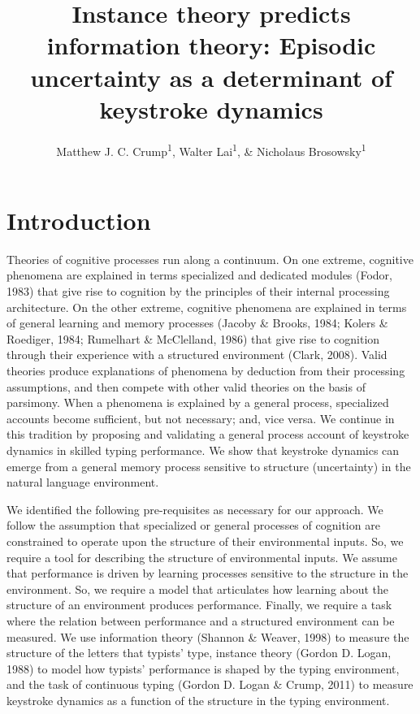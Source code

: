 \documentclass[floatsintext,man]{apa6}
\title{Instance theory predicts information theory: Episodic uncertainty as a
determinant of keystroke dynamics}
\author{Matthew J. C. Crump\textsuperscript{1}, Walter Lai\textsuperscript{1}, \& Nicholaus Brosowsky\textsuperscript{1}}
\affiliation{
    \vspace{0.5cm}
          \textsuperscript{1} Brooklyn College of the City University of New York  }
\theoremstyle{definition}
\theoremstyle{definition}
\theoremstyle{definition}
\theoremstyle{remark}
\begin{document}
\maketitle

\setcounter{secnumdepth}{0}



\section{Introduction}\label{introduction}

Theories of cognitive processes run along a continuum. On one extreme,
cognitive phenomena are explained in terms specialized and dedicated
modules (Fodor, 1983) that give rise to cognition by the principles of
their internal processing architecture. On the other extreme, cognitive
phenomena are explained in terms of general learning and memory
processes (Jacoby \& Brooks, 1984; Kolers \& Roediger, 1984; Rumelhart
\& McClelland, 1986) that give rise to cognition through their
experience with a structured environment (Clark, 2008). Valid theories
produce explanations of phenomena by deduction from their processing
assumptions, and then compete with other valid theories on the basis of
parsimony. When a phenomena is explained by a general process,
specialized accounts become sufficient, but not necessary; and, vice
versa. We continue in this tradition by proposing and validating a
general process account of keystroke dynamics in skilled typing
performance. We show that keystroke dynamics can emerge from a general
memory process sensitive to structure (uncertainty) in the natural
language environment.

We identified the following pre-requisites as necessary for our
approach. We follow the assumption that specialized or general processes
of cognition are constrained to operate upon the structure of their
environmental inputs. So, we require a tool for describing the structure
of environmental inputs. We assume that performance is driven by
learning processes sensitive to the structure in the environment. So, we
require a model that articulates how learning about the structure of an
environment produces performance. Finally, we require a task where the
relation between performance and a structured environment can be
measured. We use information theory (Shannon \& Weaver, 1998) to measure
the structure of the letters that typists' type, instance theory (Gordon
D. Logan, 1988) to model how typists' performance is shaped by the
typing environment, and the task of continuous typing (Gordon D. Logan
\& Crump, 2011) to measure keystroke dynamics as a function of the
structure in the typing environment.
\end{document}
